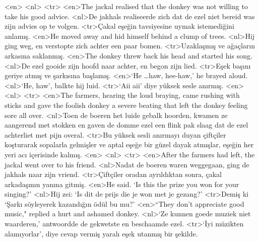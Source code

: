 <en>
<nl>
<tr>
<en>The jackal realised that the donkey was not willing to take his good advice. 
<nl>De jakhals realiseerde zich dat de ezel niet bereid was zijn advies op te volgen.
<tr>Çakal eşeğin tavsiyesine uymak istemediğini anlamış. 
<en>He moved away and hid himself behind a clump of trees. 
<nl>Hij ging weg, en verstopte zich achter een paar bomen.
<tr>Uzaklaşmış ve ağaçların arkasına saklanmış.
<en>The donkey threw back his head and started his song. 
<nl>De ezel gooide zijn hoofd naar achter, en begon zijn lied.
<tr>Eşek başını geriye atmış ve şarkısına başlamış.
<en>`He …haw, hee-haw,' he brayed aloud. 
<nl>`He, haw', balkte hij luid.
<tr>`Aii aii' diye yüksek sesle anırmış.
<en>
<nl>
<tr>
<en>The farmers, hearing the loud braying, came rushing with sticks and gave the foolish donkey a severe beating that left the donkey feeling sore all over. 
<nl>Toen de boeren het luide gebalk hoorden,  kwamen ze aangerend met stokken en gaven de domme ezel een flink pak slaag dat de ezel achterliet met pijn overal.
<tr>Bu yüksek sesli anırmayı duyan çiftçiler koşturarak sopalarla gelmişler ve aptal eşeğe bir güzel dayak atmışlar, eşeğin her yeri acı içerisinde kalmış.
<en>
<nl>
<tr>
<en>After the farmers had left, the jackal went over to his friend. 
<nl>Nadat de boeren waren weggegaan, ging de jakhals naar zijn vriend.
<tr>Çiftçiler oradan ayrıldıktan sonra, çakal arkadaşının yanına gitmiş.
<en>He said. `Is this the prize you won for your singing?'
<nl>Hij zei: `Is dit de prijs die je won met je gezang?'
<tr>Demiş ki `Şarkı söyleyerek kazandığın ödül bu mu?'
<en>“They don’t appreciate good music," replied a hurt and ashamed donkey. 
<nl>`Ze kunnen goede muziek niet waarderen,' antwoordde de gekwetste en beschaamde ezel.
<tr>`İyi müzikten alamıyorlar', diye cevap vermiş yaralı eşek utanmış bir şekilde.
